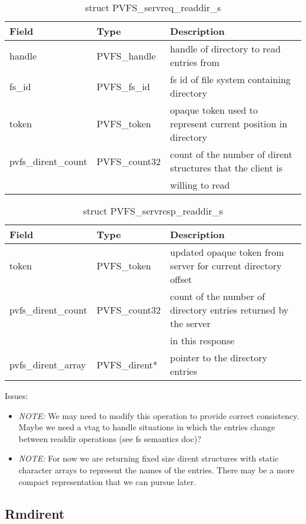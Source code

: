 \documentclass[11pt, letterpaper]{article} %
\begin{document}
\begin{table}[H]
\begin{tabular}{|l|l|l|}
\hline
Field & Type & Description \\
\hline
\hline
handle & PVFS\_handle & handle of directory to read entries from\\
\hline
fs\_id & PVFS\_fs\_id & fs id of file system containing directory\\
\hline
token & PVFS\_token & opaque token used to represent current position in
directory\\
\hline
pvfs\_dirent\_count & PVFS\_count32 & count of the number of dirent
structures that the client is\\
 & & willing to read\\
\hline
\end{tabular}
\caption{struct PVFS\_servreq\_readdir\_s \label{tab:reqreaddir}}
\end{table}

\begin{table}[H]
\begin{tabular}{|l|l|l|}
\hline
Field & Type & Description \\
\hline
\hline
token & PVFS\_token & updated opaque token from server for current
directory offset\\
\hline
pvfs\_dirent\_count & PVFS\_count32 & count of the number of directory
entries returned by the server\\
 & & in this response\\
\hline
pvfs\_dirent\_array & PVFS\_dirent* & pointer to the directory entries\\
\hline
\end{tabular}
\caption{struct PVFS\_servresp\_readdir\_s \label{tab:respreaddir}}
\end{table}

Issues:
\begin{itemize}
\item \emph{NOTE:} We may need to modify this operation to provide
correct consistency.  Maybe we need a vtag to handle situations in which
the entries change between readdir operations (see fs semantics doc)?
\item \emph{NOTE:} For now we are returning fixed size dirent structures
with static character arrays to represent the names of the entries.
There may be a more compact representation that we can pursue later.
\end{itemize}


\subsection{Rmdirent}
\end{document}

